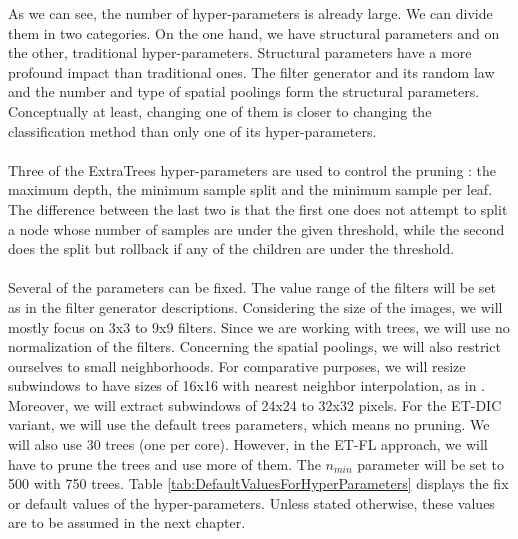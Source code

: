 \documentclass[a4paper]{report}
\newlength{\larg}
\begin{document}
	As we can see, the number of hyper-parameters is already large. We can divide them in two categories. On the one hand, we have structural parameters and on the other, traditional hyper-parameters. Structural parameters have a more profound impact than traditional ones. The filter generator and its random law and the number and type of spatial poolings form the structural parameters. Conceptually at least, changing one of them is closer to changing the classification method than only one of its hyper-parameters.
	\paragraph{}
	Three of the ExtraTrees hyper-parameters are used to control the pruning : the maximum depth, the minimum sample split and the minimum sample per leaf. The difference between the last two is that the first one does not attempt to split a node whose number of samples are under the given threshold, while the second does the split but rollback if any of the children are under the threshold. 
	\paragraph{}
	Several of the parameters can be fixed. The value range of the filters will be set as in the filter generator descriptions. Considering the size of the images, we will mostly focus on 3x3 to 9x9 filters. Since we are working with trees, we will use no normalization of the filters. Concerning the spatial poolings, we will also restrict ourselves to small neighborhoods. For comparative purposes, we will resize subwindows to have sizes of 16x16 with nearest neighbor interpolation, as in \cite{base}. Moreover, we will extract subwindows of 24x24 to 32x32 pixels. For the ET-DIC variant, we will use the default trees parameters, which means no pruning. We will also use 30 trees (one per core). However, in the ET-FL approach, we will have to prune the trees and use more of them. The $n_{min}$ parameter will be set to 500 with 750 trees. Table \ref{tab:DefaultValuesForHyperParameters} displays the fix or default values of the hyper-parameters. Unless stated otherwise, these values are to be assumed in the next chapter.
	
\end{document}
